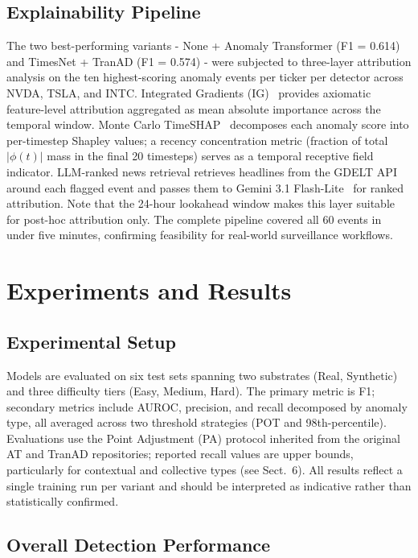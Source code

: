\documentclass{llncs}
\begin{document}
\subsection{Explainability Pipeline}

The two best-performing variants - None + Anomaly Transformer (F1 = 0.614) and TimesNet + TranAD (F1 = 0.574) - were subjected to three-layer attribution analysis on the ten highest-scoring anomaly events per ticker per detector across NVDA, TSLA, and INTC. Integrated Gradients (IG)~\cite{ref11} provides axiomatic feature-level attribution aggregated as mean absolute importance across the temporal window. Monte Carlo TimeSHAP~\cite{ref1} decomposes each anomaly score into per-timestep Shapley values; a recency concentration metric (fraction of total $|\phi(t)|$ mass in the final 20 timesteps) serves as a temporal receptive field indicator. LLM-ranked news retrieval retrieves headlines from the GDELT API around each flagged event and passes them to Gemini 3.1 Flash-Lite~\cite{ref18} for ranked attribution. Note that the 24-hour lookahead window makes this layer suitable for post-hoc attribution only. The complete pipeline covered all 60 events in under five minutes, confirming feasibility for real-world surveillance workflows.

\section{Experiments and Results}

\subsection{Experimental Setup}

Models are evaluated on six test sets spanning two substrates (Real, Synthetic) and three difficulty tiers (Easy, Medium, Hard). The primary metric is F1; secondary metrics include AUROC, precision, and recall decomposed by anomaly type, all averaged across two threshold strategies (POT and 98th-percentile). Evaluations use the Point Adjustment (PA) protocol inherited from the original AT and TranAD repositories; reported recall values are upper bounds, particularly for contextual and collective types (see Sect.~6). All results reflect a single training run per variant and should be interpreted as indicative rather than statistically confirmed.

\subsection{Overall Detection Performance}
\end{document}
